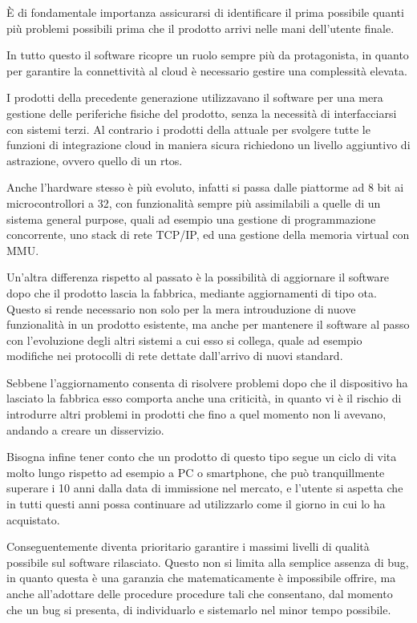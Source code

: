 \documentclass[12pt,a4paper,twoside,titlepage]{book}
\begin{document}
È di fondamentale importanza assicurarsi di identificare il prima possibile quanti
più problemi possibili prima che il prodotto arrivi nelle mani dell'utente finale.

In tutto questo il software ricopre un ruolo sempre più da protagonista, in quanto
per garantire la connettività al cloud è necessario gestire una complessità elevata.

I prodotti della precedente generazione utilizzavano il software per una mera gestione
delle periferiche fisiche del prodotto, senza la necessità di interfacciarsi con sistemi
terzi. Al contrario i prodotti della attuale per svolgere tutte le funzioni di
integrazione cloud in maniera sicura richiedono un livello aggiuntivo di astrazione,
ovvero quello di un \Gls{rtos}.

Anche l'hardware stesso è più evoluto, infatti si passa dalle piattorme ad 8 bit ai
microcontrollori a 32, con funzionalità sempre più assimilabili a quelle di un sistema
general purpose, quali ad esempio una gestione di programmazione concorrente, uno
stack di rete TCP/IP, ed una gestione della memoria virtual con MMU.

Un'altra differenza rispetto al passato è la possibilità di aggiornare il software dopo
che il prodotto lascia la fabbrica, mediante aggiornamenti di tipo \acrfull{ota}.
Questo si rende necessario non solo per la mera introuduzione di nuove funzionalità in
un prodotto esistente, ma anche per mantenere il software al passo con l'evoluzione degli
altri sistemi a cui esso si collega, quale ad esempio modifiche nei protocolli di rete
dettate dall'arrivo di nuovi standard.

Sebbene l'aggiornamento consenta di risolvere problemi dopo che il dispositivo ha lasciato la
fabbrica esso comporta anche una criticità, in quanto vi è il rischio di introdurre altri problemi
in prodotti che fino a quel momento non li avevano, andando a creare un disservizio.

Bisogna infine tener conto che un prodotto di questo tipo segue un ciclo di vita molto lungo
rispetto ad esempio a PC o smartphone, che può tranquillmente superare i 10 anni dalla data di
immissione nel mercato, e l'utente si aspetta che in tutti questi anni possa continuare ad
utilizzarlo come il giorno in cui lo ha acquistato.

Conseguentemente diventa prioritario garantire i massimi livelli di qualità possibile
sul software rilasciato. Questo non si limita alla semplice assenza di bug, in quanto
questa è una garanzia che matematicamente è impossibile offrire, ma anche all'adottare
delle procedure procedure tali che consentano, dal momento che un bug si
presenta, di individuarlo e sistemarlo nel minor tempo possibile.
\end{document}
